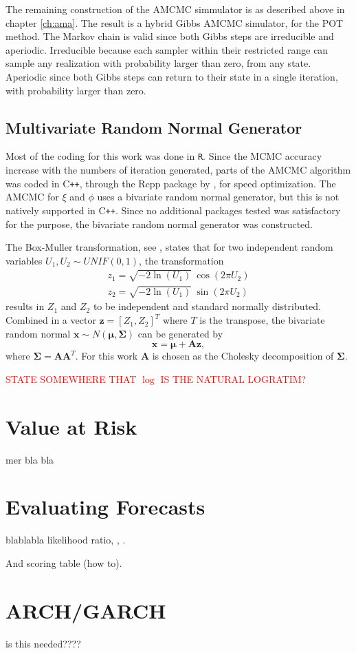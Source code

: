 The remaining construction of the AMCMC simmulator is as described above in chapter \ref{ch:ama}. The result is a hybrid Gibbs AMCMC simulator, for the POT method. The Markov chain is valid since both Gibbs steps are irreducible and aperiodic. Irreducible because each sampler within their restricted range can sample any realization with probability larger than zero, from any state. Aperiodic since both Gibbs steps can return to their state in a single iteration, with probability larger than zero.

\subsection{Multivariate Random Normal Generator}
Most of the coding for this work was done in {\tt{R}}. Since the MCMC accuracy increase with the numbers of iteration generated, parts of the AMCMC algorithm was coded in C\texttt{++}, through the Rcpp package by \cite{rcpp}, for speed optimization. The AMCMC for $\xi$ and $\phi$ uses a bivariate random normal generator, but this is not natively supported in C\texttt{++}. Since no additional packages tested was satisfactory for the purpose, the bivariate random normal generator was constructed.

The Box-Muller transformation, see \cite{BM}, states that for two independent random variables $U_1,U_2 \sim UNIF(0,1)$, the transformation
\begin{align*}
z_1=\sqrt{-2 \ln(U_1)} \ \cos(2 \pi U_2)\\
z_2=\sqrt{-2 \ln(U_1)} \ \sin(2 \pi U_2)
\end{align*}
results in $Z_1$ and $Z_2$ to be independent and standard normally distributed. Combined in a vector $\boldsymbol{z}=[Z_1,Z_2]^T$ where $T$ is the transpose, the bivariate random normal $\boldsymbol{x} \sim N(\boldsymbol{\mu},\boldsymbol{\Sigma})$ can be generated by
\begin{equation}
\boldsymbol{x}=\boldsymbol{\mu}+\boldsymbol{A}\boldsymbol{z},
\end{equation}
where $\boldsymbol{\Sigma}=\boldsymbol{A}\boldsymbol{A}^T$. For this work $\boldsymbol{A}$ is chosen as the Cholesky decomposition of $\boldsymbol{\Sigma}$.

\textcolor{red}{STATE SOMEWHERE THAT $\log$ IS THE NATURAL LOGRATIM?}


\section{Value at Risk}
mer bla bla
\section{Evaluating Forecasts}
blablabla likelihood ratio, \cite{kupiec}, \cite{christoffersen}.

And scoring table (how to).
\section{ARCH/GARCH}%
is this needed????